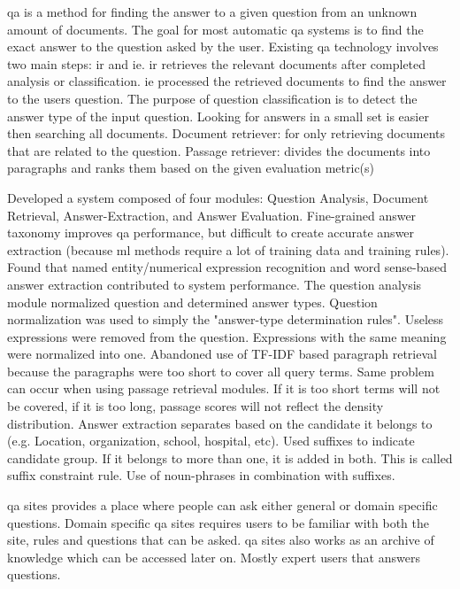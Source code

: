 \gls{qa} is a method for finding the answer to a given question from an unknown amount of documents. 
The goal for most automatic \gls{qa} systems is to find the exact answer to the question asked by the user. 
Existing \gls{qa} technology involves two main steps: \gls{ir} and \gls{ie}.
\gls{ir} retrieves the  relevant documents after completed analysis or classification.
\gls{ie} processed the retrieved documents to find the answer to the users question.
The purpose of question classification is to detect the answer type of the input question. 
Looking for answers in a small set is easier then searching all documents. 
Document retriever: for only retrieving documents that are related to the question.
Passage retriever: divides the documents into paragraphs and ranks them based on the given evaluation metric(s)
\cite{Yen2013}


Developed a system composed of four modules: Question Analysis, Document Retrieval, Answer-Extraction, and Answer Evaluation.
Fine-grained answer taxonomy improves \gls{qa} performance, but difficult to create accurate answer extraction 
(because \gls{ml} methods require a lot of training data and training rules). 
Found that named entity/numerical expression recognition and word sense-based answer extraction contributed to system performance.
The question analysis module normalized question and determined answer types. 
Question normalization was used to simply the "answer-type determination rules". 
Useless expressions were removed from the question. 
Expressions with the same meaning were normalized into one. 
Abandoned use of TF-IDF based paragraph retrieval because the paragraphs were too short to cover all query terms. 
Same problem can occur when using  passage retrieval modules. 
If it is too short terms will not be covered, if it is too long, passage scores will not reflect the density distribution.
Answer extraction separates based on the candidate it belongs to (e.g. Location, organization, school, hospital, etc).  
Used suffixes to indicate candidate group. If it belongs to more than one, it is added in both. 
This is called suffix constraint rule. 
Use of noun-phrases in combination with suffixes.
\cite{Isozaki2005}



\gls{qa} sites provides a place where people can ask either general or domain specific questions. 
Domain specific \gls{qa} sites requires users to be familiar with both the site, rules and questions that can be asked. 
\gls{qa} sites also works as an archive of knowledge which can be accessed later on. Mostly expert users that answers questions.
\cite{Movshovitz-Attias2013}





